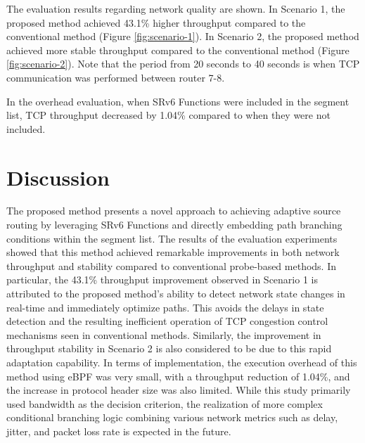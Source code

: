 \documentclass[conference]{IEEEtran}
\begin{document}
The evaluation results regarding network quality are shown.
In Scenario 1, the proposed method achieved 43.1\% higher throughput compared to the conventional method (Figure \ref{fig:scenario-1}).
In Scenario 2, the proposed method achieved more stable throughput compared to the conventional method (Figure \ref{fig:scenario-2}).
Note that the period from 20 seconds to 40 seconds is when TCP communication was performed between router 7-8.

In the overhead evaluation, when SRv6 Functions were included in the segment list, TCP throughput decreased by 1.04\% compared to when they were not included.


\section{Discussion}

The proposed method presents a novel approach to achieving adaptive source routing by leveraging SRv6 Functions and directly embedding path branching conditions within the segment list.
The results of the evaluation experiments showed that this method achieved remarkable improvements in both network throughput and stability compared to conventional probe-based methods.
In particular, the 43.1\% throughput improvement observed in Scenario 1 is attributed to the proposed method's ability to detect network state changes in real-time and immediately optimize paths. This avoids the delays in state detection and the resulting inefficient operation of TCP congestion control mechanisms seen in conventional methods.
Similarly, the improvement in throughput stability in Scenario 2 is also considered to be due to this rapid adaptation capability.
In terms of implementation, the execution overhead of this method using eBPF was very small, with a throughput reduction of 1.04\%, and the increase in protocol header size was also limited.
While this study primarily used bandwidth as the decision criterion, the realization of more complex conditional branching logic combining various network metrics such as delay, jitter, and packet loss rate is expected in the future.
\end{document}
